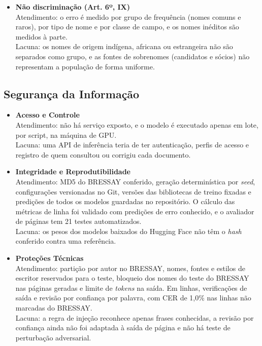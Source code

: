 \begin{itemize}
    \item \textbf{Não discriminação (Art. 6º, IX)} \\
    Atendimento: o erro é medido por grupo de frequência (nomes comuns e raros), por tipo de nome e por classe de campo, e os nomes inéditos são medidos à parte. \\
    Lacuna: os nomes de origem indígena, africana ou estrangeira não são separados como grupo, e as fontes de sobrenomes (candidatos e sócios) não representam a população de forma uniforme.
\end{itemize}

\subsection{Segurança da Informação}

\begin{itemize}
    \item \textbf{Acesso e Controle} \\
    Atendimento: não há serviço exposto, e o modelo é executado apenas em lote, por script, na máquina de GPU. \\
    Lacuna: uma API de inferência teria de ter autenticação, perfis de acesso e registro de quem consultou ou corrigiu cada documento.

    \item \textbf{Integridade e Reprodutibilidade} \\
    Atendimento: MD5 do BRESSAY conferido, geração determinística por \emph{seed}, configurações versionadas no Git, versões das bibliotecas de treino fixadas e predições de todos os modelos guardadas no repositório. O cálculo das métricas de linha foi validado com predições de erro conhecido, e o avaliador de páginas tem 21 testes automatizados. \\
    Lacuna: os pesos dos modelos baixados do Hugging Face não têm o \emph{hash} conferido contra uma referência.

    \item \textbf{Proteções Técnicas} \\
    Atendimento: partição por autor no BRESSAY, nomes, fontes e estilos de escritor reservados para o teste, bloqueio dos nomes do teste do BRESSAY nas páginas geradas e limite de \emph{tokens} na saída. Em linhas, verificações de saída e revisão por confiança por palavra, com CER de 1,0\% nas linhas não marcadas do BRESSAY. \\
    Lacuna: a regra de injeção reconhece apenas frases conhecidas, a revisão por confiança ainda não foi adaptada à saída de página e não há teste de perturbação adversarial.
\end{itemize}

